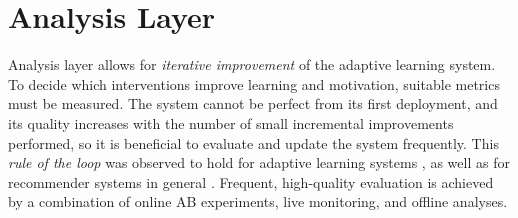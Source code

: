 
\section{Analysis Layer}
\label{sec:metrics-and-evaluation}



Analysis layer allows for \emph{iterative improvement} of the adaptive learning system.
To decide which interventions improve learning and motivation, %
  suitable metrics must be measured. %
The system cannot be perfect from its first deployment,
and its quality increases with the number of small
incremental improvements performed, so it is beneficial to
evaluate and update the system frequently.
This \emph{rule of the loop} \cite{book-of-lenses}
was observed to hold for adaptive learning systems \cite{stupid-tutoring-systems-intelligent-humans,its-domain-models}, %
as well as for recommender systems in general \cite[][Rule 16]{google-ml-rules}.
Frequent, high-quality evaluation is achieved by a combination of
  online AB experiments, live monitoring, and offline analyses.

